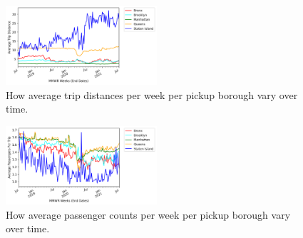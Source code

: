 \documentclass[11pt]{article}
\begin{document}
\begin{multicols}{2}
    \begin{figure}[H]
        \includegraphics[width=0.5\textwidth]{../plots/time-series-Average Trip Distance-vs-MMWR Weeks (End Dates)-by-pu_borough.png}
        \centering
        \caption{How average trip distances per week per pickup borough vary over time.} %
        \label{fig:ts-dist-weeks}
    \end{figure}

    \begin{figure}[H]
        \includegraphics[width=0.5\textwidth]{../plots/time-series-Average Passengers Per Trip-vs-MMWR Weeks (End Dates)-by-pu_borough.png}
        \centering
        \caption{How average passenger counts per week per pickup borough vary over time.} %
        \label{fig:ts-pass-count-weeks}
    \end{figure}
\end{multicols}

\end{document}

